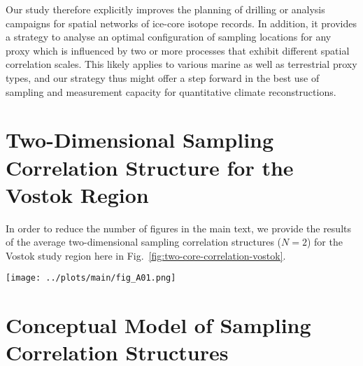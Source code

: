 \documentclass[draft]{agujournal2019}
\begin{document}
Our study therefore explicitly improves the planning of drilling or analysis
campaigns for spatial networks of ice-core isotope records. In addition, it
provides a strategy to analyse an optimal configuration of sampling locations
for any proxy which is influenced by two or more processes that exhibit
different spatial correlation scales. This likely applies to various marine as
well as terrestrial proxy types, and our strategy thus might offer a step
forward in the best use of sampling and measurement capacity for quantitative
climate reconstructions.

\appendix

\section{Two-Dimensional Sampling Correlation Structure for the Vostok Region}
\label{app:vostok.n2}

In order to reduce the number of figures in the main text, we provide the
results of the average two-dimensional sampling correlation structures ($N=2$)
for the Vostok study region here in Fig.~\ref{fig:two-core-correlation-vostok}.

\begin{figure*}[t]%
\centering
\texttt{[image: ../plots/main/fig\_A01.png]}
\caption{%
  Sampling correlation structure with temperature in the two-dimensional case of
  sampling two locations in the Vostok region. Shown is the mean correlation of
  all possible single correlations for the average of two grid cells of
  (\textbf{a}) $T_{\mathrm{2m}}$, (\textbf{b}) $T_{\mathrm{2m}}^{\mathrm{(pw)}}$
  and (\textbf{c}) $\delta^{18}\mathrm{O}^{\mathrm{(pw)}}$ time series sampled
  from the same ring or from two different rings, averaged over all target sites
  in the given region. The axes display the distance from the target site, where
  the $x$ ($y$) axis represents for the first (second) sampled ring and the tick
  marks indicate the midpoint radii of the rings. Note that for
  $\delta^{18}\mathrm{O}^{\mathrm{(pw)}}$ the -- albeit marginal -- correlation
  maximum is achieved by combining the innermost ring with the ring between
  $500$--$750$\,km.}
\label{fig:two-core-correlation-vostok}%
\end{figure*}%

\section{Conceptual Model of Sampling Correlation Structures}
\label{app:concept.model}
\end{document}
